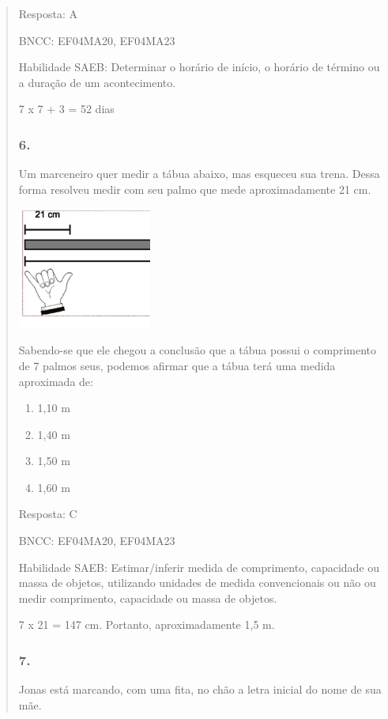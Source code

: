 \begin{enumerate}
\begin{escolha}
\begin{enumerate}
\begin{itemize}
\begin{itemize}
\begin{escolha}
\begin{quote}
\begin{escolha}
{Resposta: A

BNCC: EF04MA20, EF04MA23

Habilidade SAEB: Determinar o horário de início, o horário de término ou
a duração de um acontecimento.

7 x 7 + 3 = 52 dias

\subsubsection{6.}\label{section-162}

Um marceneiro quer medir a tábua abaixo, mas esqueceu sua trena. Dessa
forma resolveu medir com seu palmo que mede aproximadamente 21 cm.

\includegraphics[width=1.73077in,height=1.57654in]{media/image154.png}

Sabendo-se que ele chegou a conclusão que a tábua possui o comprimento
de 7 palmos seus, podemos afirmar que a tábua terá uma medida aproximada
de:

\begin{enumerate}
\def\labelenumi{\alph{enumi})}
\item
  1,10 m
\item
  1,40 m
\item
  1,50 m
\item
  1,60 m
\end{enumerate}

Resposta: C

BNCC: EF04MA20, EF04MA23

Habilidade SAEB: Estimar/inferir medida de comprimento, capacidade ou
massa de objetos, utilizando unidades de medida convencionais ou não ou
medir comprimento, capacidade ou massa de objetos.

7 x 21 = 147 cm. Portanto, aproximadamente 1,5 m.

\subsubsection{7.}\label{section-163}

Jonas está marcando, com uma fita, no chão a letra inicial do nome de
sua mãe.

}
\end{escolha}
\end{quote}
\end{escolha}
\end{itemize}
\end{itemize}
\end{enumerate}
\end{escolha}
\end{enumerate}

